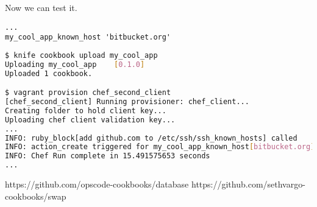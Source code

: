 Now we can test it.

\begin{lstlisting}[label=lst:cookbook-hwrp6]
...
my_cool_app_known_host 'bitbucket.org'
\end{lstlisting}

\begin{lstlisting}[language=Bash,label=lst:cookbook-hwrp7]
$ knife cookbook upload my_cool_app
Uploading my_cool_app    [0.1.0]
Uploaded 1 cookbook.

$ vagrant provision chef_second_client
[chef_second_client] Running provisioner: chef_client...
Creating folder to hold client key...
Uploading chef client validation key...
...
INFO: ruby_block[add github.com to /etc/ssh/ssh_known_hosts] called
INFO: action_create triggered for my_cool_app_known_host[bitbucket.org]
INFO: Chef Run complete in 15.491575653 seconds
...
\end{lstlisting}

https://github.com/opscode-cookbooks/database
https://github.com/sethvargo-cookbooks/swap